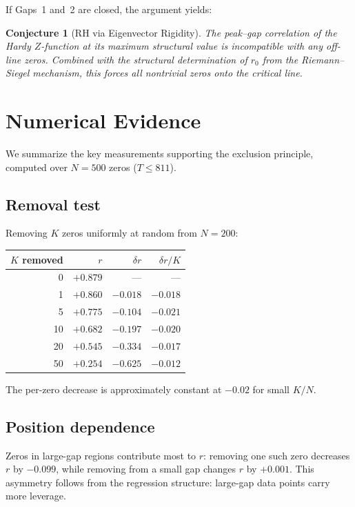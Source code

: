 \documentclass[11pt,a4paper]{article}
\newtheorem{conjecture}[theorem]{Conjecture}
\begin{document}
\medskip

If Gaps~1 and~2 are closed, the argument yields:

\begin{conjecture}[RH via Eigenvector Rigidity]
The peak--gap correlation of the Hardy $Z$-function at its maximum structural value is incompatible with any off-line zeros.
Combined with the structural determination of $r_0$ from the Riemann--Siegel mechanism, this forces all nontrivial zeros onto the critical line.
\end{conjecture}


\section{Numerical Evidence}

We summarize the key measurements supporting the exclusion principle, computed over $N = 500$ zeros ($T \leq 811$).

\subsection{Removal test}
Removing $K$ zeros uniformly at random from $N = 200$:

\begin{center}
\begin{tabular}{rrrr}
\toprule
$K$ removed & $r$ & $\delta r$ & $\delta r / K$ \\
\midrule
0 & $+0.879$ & --- & --- \\
1 & $+0.860$ & $-0.018$ & $-0.018$ \\
5 & $+0.775$ & $-0.104$ & $-0.021$ \\
10 & $+0.682$ & $-0.197$ & $-0.020$ \\
20 & $+0.545$ & $-0.334$ & $-0.017$ \\
50 & $+0.254$ & $-0.625$ & $-0.012$ \\
\bottomrule
\end{tabular}
\end{center}

The per-zero decrease is approximately constant at $-0.02$ for small $K/N$.

\subsection{Position dependence}
Zeros in large-gap regions contribute most to $r$: removing one such zero decreases $r$ by $-0.099$, while removing from a small gap changes $r$ by $+0.001$.
This asymmetry follows from the regression structure: large-gap data points carry more leverage.
\end{document}

